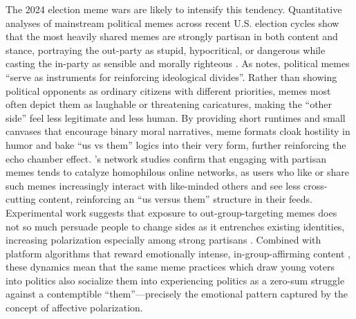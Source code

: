 \documentclass[12pt,twoside]{article}
\begin{document}
The 2024 election meme wars are likely to intensify this tendency. Quantitative analyses of mainstream political memes across recent U.S. election cycles show that the most heavily shared memes are strongly partisan in both content and stance, portraying the out-party as stupid, hypocritical, or dangerous while casting the in-party as sensible and morally righteous \parencite{collier2024compositionmainstreammemes}. As \textcite{alafnan2025roleMemesPoliticalDiscourse} notes, political memes ``serve as instruments for reinforcing ideological divides''. Rather than showing political opponents as ordinary citizens with different priorities, memes most often depict them as laughable or threatening caricatures, making the “other side” feel less legitimate and less human. By providing short runtimes and small canvases that encourage binary moral narratives, meme formats cloak hostility in humor and bake ``us vs them'' logics into their very form, further reinforcing the echo chamber effect. \textcite{kim2023partisanmemes}'s network studies confirm that engaging with partisan memes tends to catalyze homophilous online networks, as users who like or share such memes increasingly interact with like-minded others and see less cross-cutting content, reinforcing an “us versus them” structure in their feeds. Experimental work suggests that exposure to out-group-targeting memes does not so much persuade people to change sides as it entrenches existing identities, increasing polarization especially among strong partisans \parencite{galipeau2023impactpoliticalmemes}. Combined with platform algorithms that reward emotionally intense, in-group-affirming content \parencite{ye2025auditingexposurebias}, these dynamics mean that the same meme practices which draw young voters into politics also socialize them into experiencing politics as a zero-sum struggle against a contemptible “them”---precisely the emotional pattern captured by the concept of affective polarization.


\end{document}
